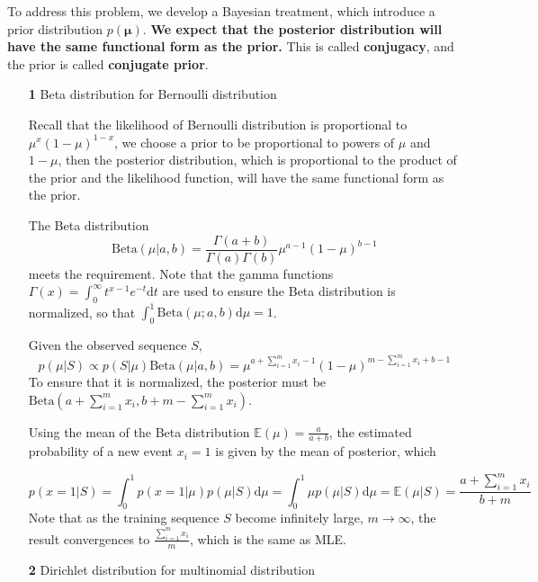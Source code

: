 \documentclass{article}
\begin{document}
	To address this problem, we develop a Bayesian treatment, which introduce a prior distribution $p(\bm{\mu})$. \textbf{We expect that the posterior distribution will have the same functional form as the prior.} This is called \textbf{conjugacy}, and the prior is called \textbf{conjugate prior}.
	
	\begin{itemize}
	\item [\textbf{1}] Beta distribution for Bernoulli distribution
	
	Recall that the likelihood of Bernoulli distribution is proportional to $\mu^x (1-\mu)^{1-x}$,	we choose a prior to be proportional to powers of $\mu$ and $1-\mu$, then the posterior distribution, which is proportional to the product of the prior and the likelihood function, will have the same functional form as the prior.
	
	The Beta distribution 
	\begin{equation}
	\mathrm{Beta}(\mu|a,b)=\frac{\Gamma(a+b)}{\Gamma(a)\Gamma(b)}\mu^{a-1}(1-\mu)^{b-1}
	\end{equation}
meets the requirement. Note that the gamma functions $\Gamma(x)=\int^\infty_0 t^{x-1} e^{-t} \mathrm{d} t$ are used to ensure the Beta distribution is normalized, so that $\int_0^1 \mathrm{Beta}(\mu;a,b)\mathrm{d}\mu = 1$.
	
	Given the observed sequence $S$, 
	\begin{equation*}
	p(\mu|S) \propto p(S|\mu) \mathrm{Beta}(\mu|a,b) = \mu^{a+\sum_{i=1}^m x_i-1}(1-\mu)^{m-\sum_{i=1}^m x_i + b-1}
	\end{equation*}
To ensure that it is normalized, the posterior must be $\mathrm{Beta}(a+\sum_{i=1}^m x_i, b+m-\sum_{i=1}^m x_i)$.

	Using the mean of the Beta distribution $\mathbb{E}(\mu)=\frac{a}{a+b}$, the estimated probability of a new event $x_i=1$ is given by the mean of posterior, which
	
	\begin{equation*}
	p(x=1|S)=\int^1_0 p(x=1|\mu)p(\mu|S) \mathrm{d}\mu = \int^1_0 \mu p(\mu|S) \mathrm{d}\mu = \mathbb{E}(\mu|S) = \frac{a+\sum_{i=1}^m x_i}{b+m}
	\end{equation*}
Note that as the training sequence $S$ become infinitely large, $m\rightarrow\infty$, the result convergences to $\frac{\sum_{i=1}^m x_i}{m}$, which is the same as MLE.
	
	\item [\textbf{2}] Dirichlet distribution for multinomial distribution


\end{itemize}
\end{document}
